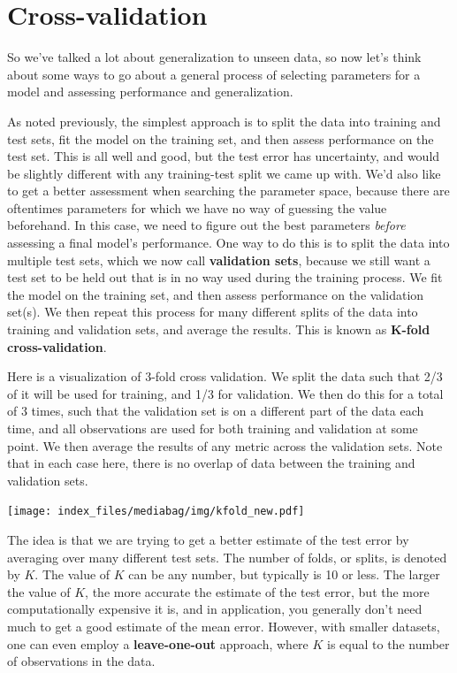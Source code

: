 \documentclass[
  letterpaper,
]{krantz}
\begin{document}
\section{Cross-validation}\label{cross-validation}

So we've talked a lot about generalization to unseen data, so now let's
think about some ways to go about a general process of selecting
parameters for a model and assessing performance and generalization.

As noted previously, the simplest approach is to split the data into
training and test sets, fit the model on the training set, and then
assess performance on the test set. This is all well and good, but the
test error has uncertainty, and would be slightly different with any
training-test split we came up with. We'd also like to get a better
assessment when searching the parameter space, because there are
oftentimes parameters for which we have no way of guessing the value
beforehand. In this case, we need to figure out the best parameters
\emph{before} assessing a final model's performance. One way to do this
is to split the data into multiple test sets, which we now call
\textbf{validation sets}, because we still want a test set to be held
out that is in no way used during the training process. We fit the model
on the training set, and then assess performance on the validation
set(s). We then repeat this process for many different splits of the
data into training and validation sets, and average the results. This is
known as \textbf{K-fold cross-validation}.

Here is a visualization of 3-fold cross validation. We split the data
such that 2/3 of it will be used for training, and 1/3 for validation.
We then do this for a total of 3 times, such that the validation set is
on a different part of the data each time, and all observations are used
for both training and validation at some point. We then average the
results of any metric across the validation sets. Note that in each case
here, there is no overlap of data between the training and validation
sets.

\texttt{[image: index\_files/mediabag/img/kfold\_new.pdf]}

The idea is that we are trying to get a better estimate of the test
error by averaging over many different test sets. The number of folds,
or splits, is denoted by \(K\). The value of \(K\) can be any number,
but typically is 10 or less. The larger the value of \(K\), the more
accurate the estimate of the test error, but the more computationally
expensive it is, and in application, you generally don't need much to
get a good estimate of the mean error. However, with smaller datasets,
one can even employ a \textbf{leave-one-out} approach, where \(K\) is
equal to the number of observations in the data.
\end{document}
